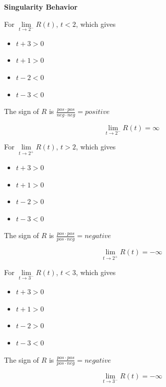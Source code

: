 \documentclass{ximera}
\begin{document}
\begin{explanation} \textbf{\textcolor{red!75!green}{Singularity Behavior}} 


For $\lim\limits_{t \to 2^-}R(t)$,  $t < 2$, which gives

\begin{itemize}
\item $t + 3 > 0$
\item $t + 1 > 0$
\item $t - 2 < 0$
\item $t - 3 < 0$
\end{itemize}


The sign of $R$ is $\frac{pos \cdot pos}{neg \cdot neg} = positive$ 



\[
\lim\limits_{t \to 2^-}R(t) = \infty
\]






For $\lim\limits_{t \to 2^+}R(t)$,  $t > 2$, which gives

\begin{itemize}
\item $t + 3 > 0$
\item $t + 1 > 0$
\item $t - 2 > 0$
\item $t - 3 < 0$
\end{itemize}


The sign of $R$ is $\frac{pos \cdot pos}{pos \cdot neg} = negative$ 



\[
\lim\limits_{t \to 2^+}R(t) = -\infty
\]





For $\lim\limits_{t \to 3^-}R(t)$,  $t < 3$, which gives

\begin{itemize}
\item $t + 3 > 0$
\item $t + 1 > 0$
\item $t - 2 > 0$
\item $t - 3 < 0$
\end{itemize}


The sign of $R$ is $\frac{pos \cdot pos}{pos \cdot neg} = negative$ 



\[
\lim\limits_{t \to 3^-}R(t) = -\infty
\]








\end{explanation}
\end{document}
